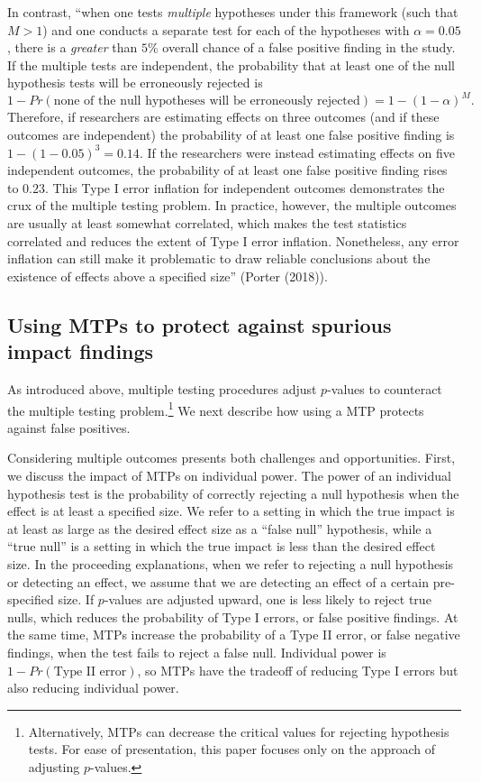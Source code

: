 \documentclass[
]{article}
\begin{document}
In contrast, ``when one tests \emph{multiple} hypotheses under this
framework (such that \(M>1\)) and one conducts a separate test for each
of the hypotheses with \(\alpha=0.05\), there is a \emph{greater} than
\(5\%\) overall chance of a false positive finding in the study. If the
multiple tests are independent, the probability that at least one of the
null hypothesis tests will be erroneously rejected is
\[1-Pr(\text{none of the null hypotheses will be erroneously rejected}) = 1-(1-\alpha)^M.\]
Therefore, if researchers are estimating effects on three outcomes (and
if these outcomes are independent) the probability of at least one false
positive finding is \(1-(1-0.05)^3=0.14\). If the researchers were
instead estimating effects on five independent outcomes, the probability
of at least one false positive finding rises to \(0.23\). This Type I
error inflation for independent outcomes demonstrates the crux of the
multiple testing problem. In practice, however, the multiple outcomes
are usually at least somewhat correlated, which makes the test
statistics correlated and reduces the extent of Type I error inflation.
Nonetheless, any error inflation can still make it problematic to draw
reliable conclusions about the existence of effects above a specified
size'' (Porter (2018)).

\subsection{Using MTPs to protect against spurious impact findings}
\label{sec:mtp_use}

As introduced above, multiple testing procedures adjust \(p\)-values to
counteract the multiple testing
problem.\footnote{Alternatively, MTPs can decrease the critical values for rejecting hypothesis tests. For ease of presentation, this paper focuses only on the approach of adjusting $p$-values.}
We next describe how using a MTP protects against false positives.

Considering multiple outcomes presents both challenges and
opportunities. First, we discuss the impact of MTPs on individual power.
The power of an individual hypothesis test is the probability of
correctly rejecting a null hypothesis when the effect is at least a
specified size. We refer to a setting in which the true impact is at
least as large as the desired effect size as a ``false null''
hypothesis, while a ``true null'' is a setting in which the true impact
is less than the desired effect size. In the proceeding explanations,
when we refer to rejecting a null hypothesis or detecting an effect, we
assume that we are detecting an effect of a certain pre-specified size.
If \(p\)-values are adjusted upward, one is less likely to reject true
nulls, which reduces the probability of Type I errors, or false positive
findings. At the same time, MTPs increase the probability of a Type II
error, or false negative findings, when the test fails to reject a false
null. Individual power is \(1 - Pr(\text{Type II error})\), so MTPs have
the tradeoff of reducing Type I errors but also reducing individual
power.
\end{document}
